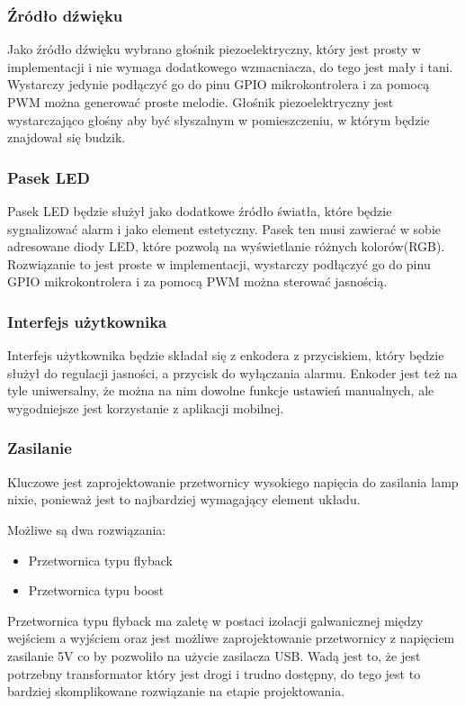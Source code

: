 \documentclass[../main.tex]{subfiles}
\begin{document}
\subsubsection{Źródło dźwięku}
Jako źródło dźwięku wybrano głośnik piezoelektryczny, który jest prosty w implementacji i nie wymaga dodatkowego wzmacniacza, do tego jest mały i tani.
Wystarczy jedynie podłączyć go do pinu GPIO mikrokontrolera i za pomocą PWM można generować proste melodie. Głośnik piezoelektryczny jest wystarczająco głośny
aby być słyszalnym w pomieszczeniu, w którym będzie znajdował się budzik.

\subsubsection{Pasek LED}
Pasek LED będzie służył jako dodatkowe źródło światła, które będzie sygnalizować alarm i jako element estetyczny. Pasek ten musi 
zawierać w sobie adresowane diody LED, które pozwolą na wyświetlanie różnych kolorów(RGB).
Rozwiązanie to jest proste w implementacji, wystarczy podłączyć go do pinu GPIO mikrokontrolera i za pomocą PWM można sterować jasnością.

\subsubsection{Interfejs użytkownika}
Interfejs użytkownika będzie składał się z enkodera z przyciskiem, który będzie służył do regulacji jasności, a przycisk do wyłączania alarmu.
Enkoder jest też na tyle uniwersalny, że można na nim dowolne funkcje ustawień manualnych, ale wygodniejsze jest korzystanie z aplikacji mobilnej.

\subsubsection{Zasilanie}
Kluczowe jest zaprojektowanie przetwornicy wysokiego napięcia do zasilania lamp nixie, ponieważ jest to najbardziej wymagający element układu.

Możliwe są dwa rozwiązania:
\begin{itemize}
    \item Przetwornica typu flyback
    \item Przetwornica typu boost
\end{itemize}

Przetwornica typu flyback ma zaletę w postaci izolacji galwanicznej między wejściem a wyjściem oraz jest możliwe zaprojektowanie przetwornicy z napięciem zasilanie 5V
co by pozwoliło na użycie zasilacza USB. Wadą jest to, że jest potrzebny transformator który jest drogi i trudno dostępny, do tego jest to bardziej skomplikowane rozwiązanie na 
etapie projektowania.
\end{document}
